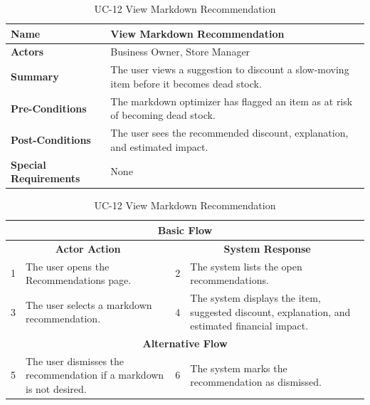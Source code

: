 \documentclass{StockSense}
\begin{document}
\begin{table}[!htbp]
\centering
\vspace*{2\baselineskip}
\caption{UC-12 View Markdown Recommendation}
{\normalsize\linespread{1.10}\selectfont
\begin{tabular}{|p{}|p{}|}
\hline
\textbf{Name} & View Markdown Recommendation \\ \hline
\textbf{Actors} & Business Owner, Store Manager \\ \hline
\textbf{Summary} & The user views a suggestion to discount a slow-moving item before it becomes dead stock. \\ \hline
\textbf{Pre-Conditions} & The markdown optimizer has flagged an item as at risk of becoming dead stock. \\ \hline
\textbf{Post-Conditions} & The user sees the recommended discount, explanation, and estimated impact. \\ \hline
\textbf{Special Requirements} & None \\ \hline
\end{tabular}\par\nointerlineskip
\begin{tabular}{|p{}|p{}|p{}|p{}|}
\multicolumn{4}{|c|}{\textbf{Basic Flow}} \\ \hline
\multicolumn{2}{|c|}{\textbf{Actor Action}} & \multicolumn{2}{c|}{\textbf{System Response}} \\ \hline
1 & The user opens the Recommendations page. & 2 & The system lists the open recommendations. \\ \hline
3 & The user selects a markdown recommendation. & 4 & The system displays the item, suggested discount, explanation, and estimated financial impact. \\ \hline
\multicolumn{4}{|c|}{\textbf{Alternative Flow}} \\ \hline
5 & The user dismisses the recommendation if a markdown is not desired. & 6 & The system marks the recommendation as dismissed. \\ \hline
\end{tabular}\par}
\end{table}
\end{document}
